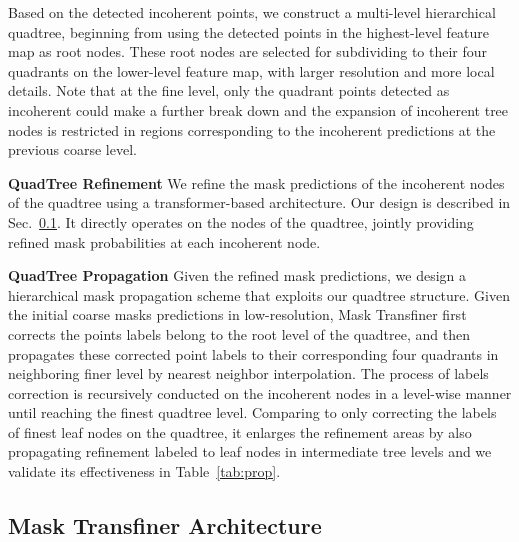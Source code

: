 \documentclass[10pt,twocolumn,letterpaper]{article}
\newcommand{\parsection}[1]{\vspace{1mm}\noindent\textbf{#1}}
\begin{document}
Based on the detected incoherent points, we construct a multi-level hierarchical quadtree, beginning from using the detected points in the highest-level feature map as root nodes. These root nodes are selected for subdividing to their four quadrants on the lower-level feature map, with larger resolution and more local details. Note that at the fine level, only the quadrant points detected as incoherent could make a further break down and the expansion of incoherent tree nodes is restricted in regions corresponding to the incoherent predictions at the previous coarse level. 

\parsection{QuadTree Refinement}
We refine the mask predictions of the incoherent nodes of the quadtree using a transformer-based architecture. Our design is described in Sec.~\ref{sec:architecture}. It directly operates on the nodes of the quadtree, jointly providing refined mask probabilities at each incoherent node.

\parsection{QuadTree Propagation}
Given the refined mask predictions, we design a hierarchical mask propagation scheme that exploits our quadtree structure. Given the initial coarse masks predictions in low-resolution, Mask Transfiner first corrects the points labels belong to the root level of the quadtree, and then propagates these corrected point labels to their corresponding four quadrants in neighboring finer level by nearest neighbor interpolation. The process of labels correction is recursively conducted on the incoherent nodes in a level-wise manner until reaching the finest quadtree level. Comparing to only correcting the labels of finest leaf nodes on the quadtree, it enlarges the refinement areas by also propagating refinement labeled to leaf nodes in intermediate tree levels and we validate its effectiveness in Table~\ref{tab:prop}.

\subsection{Mask Transfiner Architecture}
\label{sec:architecture}
\end{document}
